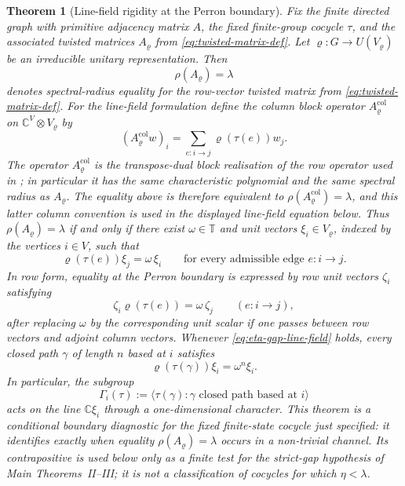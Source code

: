 \documentclass[11pt,a4paper]{amsart}
\theoremstyle{plain}
\newtheorem{theorem}{Theorem}[section]
\theoremstyle{definition}
\theoremstyle{remark}
\newcommand{\CC}{\mathbb{C}}
\newcommand{\TT}{\mathbb{T}}
\begin{document}
\begin{theorem}[Line-field rigidity at the Perron boundary]
  \label{thm:eta-gap-rigidity}
  Fix the finite directed graph with primitive adjacency matrix \(A\), the
  fixed finite-group cocycle \(\tau\), and the associated twisted matrices
  \(A_\varrho\) from \eqref{eq:twisted-matrix-def}.  Let
  \(\varrho:G\to U(V_\varrho)\) be an irreducible unitary representation.
  Then
  \[
    \rho(A_\varrho)=\lambda
  \]
  denotes spectral-radius equality for the row-vector twisted matrix from
  \eqref{eq:twisted-matrix-def}. For the line-field formulation define
  the column block operator \(A_\varrho^{\mathrm{col}}\) on
  \(\CC^V\otimes V_\varrho\) by
  \[
    (A_\varrho^{\mathrm{col}} w)_i
    =
    \sum_{e:i\to j}\varrho(\tau(e))w_j .
  \]
  The operator \(A_\varrho^{\mathrm{col}}\) is the transpose-dual block
  realisation of the row operator used in
  ; in particular it has the same
  characteristic polynomial and the same spectral radius as
  \(A_\varrho\). The equality above is therefore equivalent to
  \(\rho(A_\varrho^{\mathrm{col}})=\lambda\), and this latter column
  convention is used in the displayed line-field equation below.
  Thus \(\rho(A_\varrho)=\lambda\) if and only if there exist
  \(\omega\in\TT\) and unit vectors
  \(\xi_i\in V_\varrho\), indexed by the vertices \(i\in V\), such that
  \begin{equation}\label{eq:eta-gap-line-field}
    \varrho(\tau(e))\xi_j=\omega\,\xi_i
    \qquad
    \text{for every admissible edge } e:i\to j.
  \end{equation}
  In row form, equality at the Perron boundary is expressed by
  row unit vectors \(\zeta_i\) satisfying
  \[
    \zeta_i\varrho(\tau(e))=\omega\,\zeta_j
    \qquad(e:i\to j),
  \]
  after replacing \(\omega\) by the corresponding unit scalar if one
  passes between row vectors and adjoint column vectors.
  Whenever \eqref{eq:eta-gap-line-field} holds, every closed path
  \(\gamma\) of length \(n\) based at \(i\) satisfies
  \begin{equation}\label{eq:eta-gap-loop-character}
    \varrho(\tau(\gamma))\xi_i=\omega^n\xi_i.
  \end{equation}
  In particular, the subgroup
  \[
    \Gamma_i(\tau)
    :=
    \bigl\langle \tau(\gamma):
      \gamma \text{ closed path based at } i
    \bigr\rangle
  \]
  acts on the line \(\CC\xi_i\) through a one-dimensional character.  This
  theorem is a conditional boundary diagnostic for the fixed finite-state cocycle just
  specified: it identifies exactly when equality \(\rho(A_\varrho)=\lambda\)
  occurs in a non-trivial channel.  Its contrapositive is used below only as a
  finite test for the strict-gap hypothesis of Main Theorems~II--III; it is not
  a classification of cocycles for which \(\eta<\lambda\).
\end{theorem}
\end{document}
